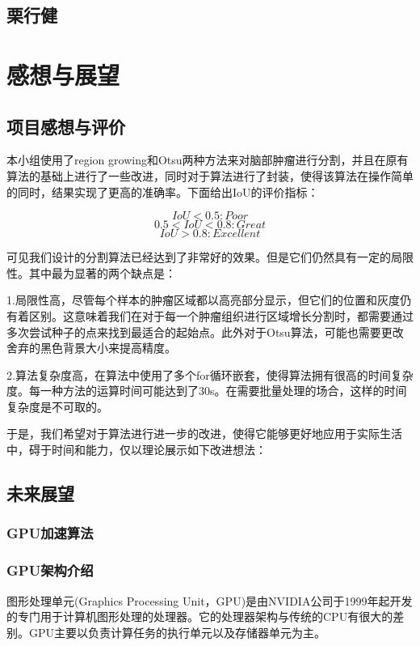 \documentclass[UTF8]{ctexart}
\begin{document}
\subsection{栗行健}

\section{感想与展望}
	
	\subsection{项目感想与评价}

	本小组使用了region growing和Otsu两种方法来对脑部肿瘤进行分割，并且在原有算法的基础上进行了一些改进，同时对于算法进行了封装，使得该算法在操作简单的同时，结果实现了更高的准确率。下面给出IoU的评价指标：

	$$ IoU <{0.5} : Poor $$
	$$ {0.5}<IoU<{0.8} : Great $$
	$$ IoU>{0.8} : Excellent $$

	可见我们设计的分割算法已经达到了非常好的效果。但是它们仍然具有一定的局限性。其中最为显著的两个缺点是：

	1.局限性高，尽管每个样本的肿瘤区域都以高亮部分显示，但它们的位置和灰度仍有着区别。这意味着我们在对于每一个肿瘤组织进行区域增长分割时，都需要通过多次尝试种子的点来找到最适合的起始点。此外对于Otsu算法，可能也需要更改舍弃的黑色背景大小来提高精度。

	2.算法复杂度高，在算法中使用了多个for循环嵌套，使得算法拥有很高的时间复杂度。每一种方法的运算时间可能达到了30s。在需要批量处理的场合，这样的时间复杂度是不可取的。

	于是，我们希望对于算法进行进一步的改进，使得它能够更好地应用于实际生活中，碍于时间和能力，仅以理论展示如下改进想法：

	\subsection{未来展望}

	\subsubsection{GPU加速算法}

	\subsubsection*{GPU架构介绍}

    图形处理单元(Graphics Processing Unit，GPU)是由NVIDIA公司于1999年起开发的专门用于计算机图形处理的处理器。它的处理器架构与传统的CPU有很大的差别。GPU主要以负责计算任务的执行单元以及存储器单元为主。
    
\end{document}
